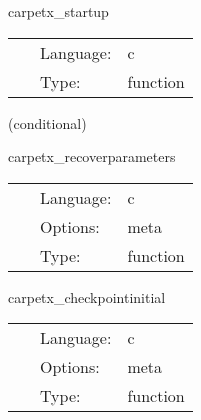 
\hspace{5mm} carpetx\_startup 

\hspace{5mm}{\it start up the driver } 


\hspace{5mm}

 \begin{tabular*}{160mm}{cll} 
~ & Language:  & c \\ 
~ & Type:  & function \\ 
\end{tabular*} 


\vspace{5mm}

   (conditional) 

\hspace{5mm} carpetx\_recoverparameters 

\hspace{5mm}{\it recover parameters } 


\hspace{5mm}

 \begin{tabular*}{160mm}{cll} 
~ & Language:  & c \\ 
~ & Options:  & meta \\ 
~ & Type:  & function \\ 
\end{tabular*} 


\vspace{5mm}


\hspace{5mm} carpetx\_checkpointinitial 

\hspace{5mm}{\it checkpoint initial conditions } 


\hspace{5mm}

 \begin{tabular*}{160mm}{cll} 
~ & Language:  & c \\ 
~ & Options:  & meta \\ 
~ & Type:  & function \\ 
\end{tabular*} 


\vspace{5mm}



